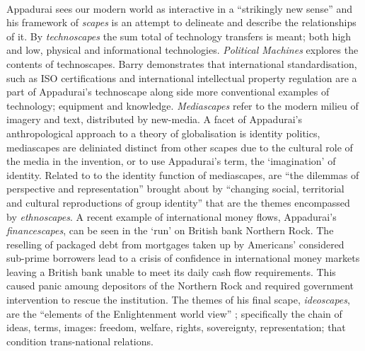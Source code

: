 \documentclass{article}
\begin{document}
\begin{doublespacing}
\paragraph{}Appadurai sees our modern world as interactive in a ``strikingly new sense'' \cite[p.27]{Appadurai:1996lp} and his framework of \emph{scapes} is an attempt to delineate and describe the relationships of it. By \emph{technoscapes} the sum total of technology transfers is meant; both high and low, physical and informational technologies.  \emph{Political Machines} explores the contents of technoscapes. Barry demonstrates that international standardisation, such as ISO certifications and international intellectual property regulation are a part of Appadurai's technoscape along side more conventional examples of technology; equipment and knowledge. \emph{Mediascapes} refer to the modern milieu of imagery and text, distributed by new-media. A facet of Appadurai's anthropological approach to a theory of globalisation is identity politics, mediascapes are deliniated distinct from other scapes due to the cultural role of the media in the invention, or to use Appadurai's term, the `imagination' of identity. Related to to the identity function of mediascapes, are ``the dilemmas of perspective and representation'' brought about by ``changing social, territorial and cultural reproductions of group identity'' \cite[p.48]{Appadurai:1996lp} that are the themes encompassed by \emph{ethnoscapes}. A recent example of international money flows, Appadurai's \emph{financescapes}, can be seen in the `run' on British bank Northern Rock. The reselling of packaged debt from mortgages taken up by Americans' considered sub-prime borrowers lead to a crisis of confidence in international money markets leaving a British bank unable to meet its daily cash flow requirements. This caused panic amoung depositors of the Northern Rock and required government intervention to rescue the institution. The themes of his final scape, \emph{ideoscapes}, are the ``elements of the Enlightenment world view'' \cite[p.36]{Appadurai:1996lp}; specifically the chain of ideas, terms, images: freedom, welfare, rights, sovereignty, representation; that condition trans-national relations.


\end{doublespacing}
\end{document}
